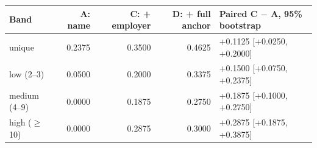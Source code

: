 \begin{tabular}{@{}lrrrl@{}}
\toprule
Band & A: name & C: + employer & D: + full anchor & Paired C $-$ A, 95\% bootstrap \\
\midrule
unique & 0.2375 & 0.3500 & 0.4625 & +0.1125 [+0.0250, +0.2000] \\
low (2--3) & 0.0500 & 0.2000 & 0.3375 & +0.1500 [+0.0750, +0.2375] \\
medium (4--9) & 0.0000 & 0.1875 & 0.2750 & +0.1875 [+0.1000, +0.2750] \\
high ($\ge$10) & 0.0000 & 0.2875 & 0.3000 & +0.2875 [+0.1875, +0.3875] \\
\bottomrule
\end{tabular}
